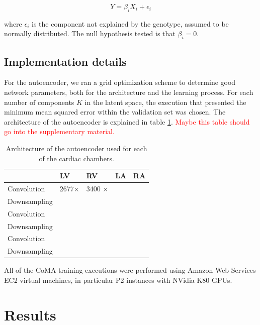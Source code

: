 \documentclass[twocolumn]{llncs}
\begin{document}
\begin{equation}
Y = \beta_{i}X_i+\epsilon_{i}
\end{equation}

\noindent where $\epsilon_{i}$ is the component not explained by the genotype, assumed to be normally distributed. The null hypothesis tested is that $\beta_{i}=0$.

\subsection{Implementation details}
For the autoencoder, we ran a grid optimization scheme to determine good network parameters, both for the architecture and the learning process. For each number of components $K$ in the latent space, the execution that presented the minimum mean squared error within the validation set was chosen.
The architecture of the autoencoder is explained in table \ref{table:AE_arch}. \textcolor{red}{Maybe this table should go into the supplementary material.}

\begin{table}[]
\begin{center}
\begin{tabular}{|l|l|l|l|l|}
\hline
             & \textbf{LV} & \textbf{RV} & LA & RA \\ \hline
Convolution  & 2677$\times$  & 3400 $\times$  &    &    \\ \hline
Downsampling &             &             &    &    \\ \hline
Convolution  &             &             &    &    \\ \hline
Downsampling &             &             &    &    \\ \hline
Convolution  &             &             &    &    \\ \hline
Downsampling &             &             &    &    \\ \hline
\end{tabular}
\end{center}
\label{table:AE_arch}
\caption{Architecture of the autoencoder used for each of the cardiac chambers.}
\end{table}



All of the CoMA training executions were performed using Amazon Web Services EC2 virtual machines, in particular P2 instances with NVidia K80 GPUs.

\section{Results}
\end{document}
